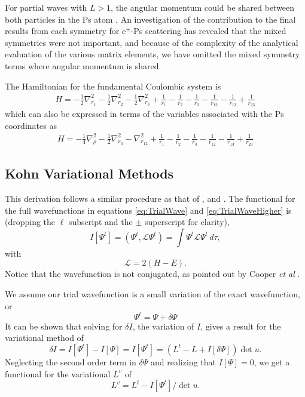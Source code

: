 \documentclass[preprint,showpacs,preprintnumbers,amsmath,amssymb]{revtex4}
\newcommand{\beq}{\begin{equation}}
\newcommand{\eeq}{\end{equation}}
\begin{document}
For partial waves with $L>1$, the angular momentum could be shared between both particles in the Ps atom \cite{Schwartz1961a}. An investigation of the contribution to the final results from each symmetry for e$^+$-Ps scattering \cite{VanReeth1997} has revealed that the mixed symmetries were not important, and because of the complexity of the analytical evaluation of the various matrix elements, we have omitted the mixed symmetry terms where angular momentum is shared.

The Hamiltonian for the fundamental Coulombic system is
\begin{align}
H = -\frac{1}{2} \nabla_{r_1}^2 - \frac{1}{2} \nabla_{r_2}^2 - \frac{1}{2} \nabla_{r_3}^2 + \frac {1}{r_1}-\frac {1}{r_2}-\frac {1}{r_3}-\frac {1}{r_{12}}-\frac {1}{r_{13}}+\frac {1}{r_{23}}
	\label{Hamiltonian1}
\end{align}
which can also be expressed in terms of the variables associated with the Ps coordinates as
\begin{align}
H = -\frac{1}{4} \nabla_{\rho}^2 - \frac{1}{2} \nabla_{r_3}^2 - \nabla_{r_{12}}^2 + \frac {1}{r_1}-\frac {1}{r_2}-\frac {1}{r_3}-\frac {1}{r_{12}}-\frac {1}{r_{13}}+\frac {1}{r_{23}}
	\label{Hamiltonian2}
\end{align}


\subsection{Kohn Variational Methods}
\label{sec:Kohn}

This derivation follows a similar procedure as that of \cite{Lucchese1989}, \cite{Cooper2010} and \cite{Armour1991}.
The functional for the full wavefunctions in equations \ref{eq:TrialWave} and \ref{eq:TrialWaveHigher} is (dropping the $\ell$ subscript and the $\pm$ superscript for clarity),
\begin{equation}
I[\Psi^t] = \left(\Psi^t, \mathcal{L} \Psi^t \right) = \int \Psi^t \mathcal{L} \Psi^t \,d\tau,
\label{eq:IlDefPsi}
\end{equation}
with
\beq
\mathcal{L} = 2(H - E).
\label{eq:LDef}
\eeq
Notice that the wavefunction is not conjugated, as pointed out by Cooper \emph{et al} \cite{Cooper2010}.

We assume our trial wavefunction is a small variation of the exact wavefunction, or
\beq
\Psi^t = \Psi + \delta \Psi
\label{eq:PsiTrialRelation}
\eeq
It can be shown that solving for $\delta I$, the variation of $I$, gives a result for the variational method of
\beq
\delta I = I[\Psi^t] - I[\Psi] = I[\Psi^t] = (L^t - L + I[\delta \Psi]) \det u.
\label{eq:IlPsiVariation}
\eeq
Neglecting the second order term in $\delta \Psi$ and realizing that $I[\Psi] = 0$, we get a functional for the variational $L^v$ of
\beq
L^v = L^t - I[\Psi^t] / \det u.
\label{eq:ComplexKohnVariation}
\eeq
\end{document}
